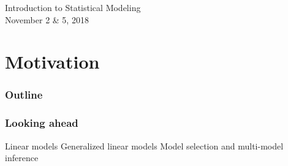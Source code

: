 \documentclass[color=usenames,dvipsnames]{beamer}\usepackage[]{graphicx}\usepackage[]{color}
\begin{document}



\begin{frame}[plain]
  \huge
  \centering \par
  \textcolor{NavyBlue}{Introduction to Statistical Modeling} \\
  \vspace{1cm}
  \Large
  November 2 \& 5, 2018 \par
\end{frame}


\section{Motivation}


\begin{frame}
  \frametitle{Outline}
  \LARGE
\end{frame}



\begin{frame}
  \frametitle{Looking ahead}
  \Large
  Linear models
  \vfill
  Generalized linear models
  \vfill
  Model selection and multi-model inference
\end{frame}
\end{document}
